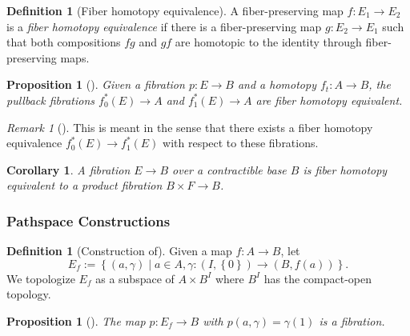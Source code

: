 \documentclass[reqno]{amsart}
\newtheorem{proposition}[theorem]{Proposition}
\newtheorem{corollary}[theorem]{Corollary}
\theoremstyle{definition}
\newtheorem{definition}[theorem]{Definition}
\theoremstyle{remark}
\newtheorem*{remark}{Remark}
\begin{document}
     \begin{definition}[Fiber homotopy equivalence]
         A fiber-preserving map
         $f \colon E_1 \to E_2$ is a
         \textit{fiber homotopy equivalence} if there
         is a fiber-preserving map
         $g \colon E_2 \to E_1$ such that both
         compositions $fg$ and $gf$ are homotopic to the identity
         through fiber-preserving maps.
     \end{definition}

     \begin{proposition}[]
         Given a fibration
         $p \colon E \to B$ and a homotopy 
         $f_t \colon A \to B$, the pullback fibrations
         $f_0^{*}(E) \to A$ and
         $f_1^{*}\left( E \right) \to A$ are
         fiber homotopy equivalent.
     \end{proposition}

     \begin{remark}[]
         This is meant in the sense that
         there exists a fiber homotopy equivalence
         $f_0^{*}(E) \to f_1^{*}(E)$ with respect to
         these fibrations.
     \end{remark}

     \begin{corollary}
         A fibration $E \to B$ over a contractible
         base $B$ is fiber homotopy equivalent to
         a product fibration $B \times F \to B$.
     \end{corollary}

\subsubsection{Pathspace Constructions}

     \begin{definition}[Construction of]
         Given a map $f \colon A \to B$, let
         \[
         E_f := 
         \left\{ \left( a, \gamma \right)  \mid 
         a \in A, \gamma \colon 
     \left( I, \left\{ 0 \right\}  \right) \to 
 \left( B, f(a) \right) \right\} .
         \] 
         We topologize $E_f$ as a subspace of
         $A \times B^{I}$ where
         $B^{I}$ has the compact-open topology.
     \end{definition}

     \begin{proposition}[]
         The map
         $p \colon E_f \to B$ with
         $p \left( a, \gamma \right) = \gamma(1)$ is
         a fibration.
     \end{proposition}
\end{document}

